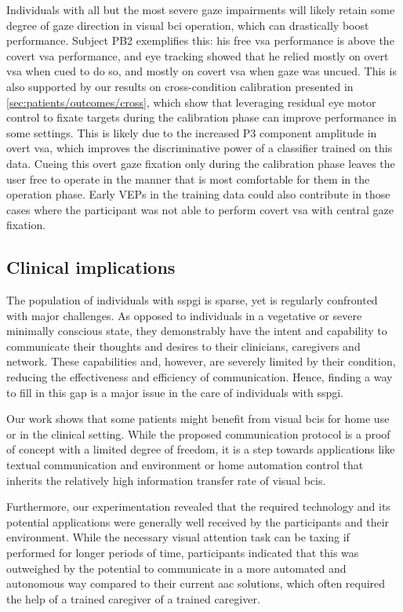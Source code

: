 \documentclass[twocolumn]{article}
\begin{document}
Individuals with all but the most severe gaze impairments will likely retain
some degree of gaze direction in visual \ac{bci} operation, which can
drastically boost performance.
Subject PB2 exemplifies this: his free \ac{vsa} performance is above the covert
\ac{vsa} performance, and eye tracking showed that he relied mostly
on overt \ac{vsa} when cued to do so, and mostly on covert \ac{vsa} when
gaze was uncued.
This is also supported by our results on cross-condition calibration presented
in \cref{sec:patients/outcomes/cross}, which show that leveraging residual
eye motor control to fixate targets during the calibration phase can improve
performance in some settings.
This is likely due to the increased P3 component amplitude in overt \ac{vsa},
which improves the discriminative power of a classifier trained on this data.
Cueing this overt gaze fixation only during the calibration phase leaves the user
free to operate in the manner that is most comfortable for them in the
operation phase.
Early VEPs in the training data could also contribute in those cases where the participant was not
able to perform covert \ac{vsa} with central gaze fixation.

\subsection{Clinical implications}
The population of individuals with \ac{sspgi} is sparse, yet is regularly
confronted with major challenges.
As opposed to individuals in a vegetative or severe minimally conscious state,
they demonstrably have the intent and capability to communicate their thoughts
and desires to their clinicians, caregivers and network.
These capabilities and, however, are severely limited by their condition,
reducing the effectiveness and efficiency of communication.
Hence, finding a way to fill in this gap is a major issue in the care of
individuals with \ac{sspgi}.

Our work shows that some patients might benefit from visual \acp{bci}
for home use or in the clinical setting.
While the proposed communication protocol is a proof of concept with a limited degree
of freedom, it is a step towards applications like textual communication and
environment or home automation control that inherits the relatively high
information transfer rate of visual \acp{bci}.

Furthermore, our experimentation revealed that the required technology and its
potential applications were generally well received by the participants and their
environment.
While the necessary visual attention task can be taxing if performed for longer
periods of time, participants indicated that this was outweighed by the
potential to communicate in a more automated and autonomous way compared to
their current \ac{aac} solutions, which often required the help of a trained caregiver of a trained
caregiver.
\end{document}
